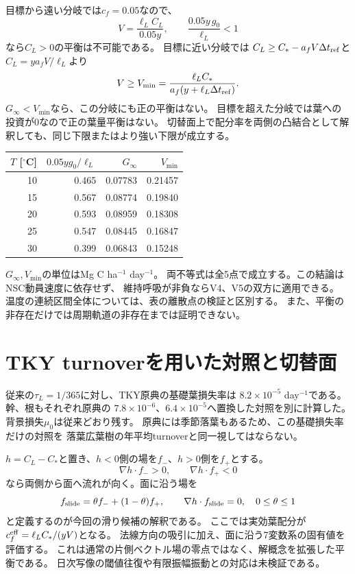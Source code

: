 \documentclass[a4paper,11pt]{ltjsarticle}
\begin{document}
目標から遠い分岐では$c_f=0.05$なので、
\[
V=\frac{\ell_LC_L}{0.05y},\qquad
\frac{0.05y\,g_0}{\ell_L}<1
\]
なら$C_L>0$の平衡は不可能である。
目標に近い分岐では
$C_L\ge C_*-a_fV\Delta t_{\rm ref}$と
$C_L=ya_fV/\ell_L$より
\begin{equation}
V\ge V_{\min}
=\frac{\ell_LC_*}{a_f(y+\ell_L\Delta t_{\rm ref})}.
\end{equation}
$G_\infty<V_{\min}$なら、この分岐にも正の平衡はない。
目標を超えた分岐では葉への投資が0なので正の葉量平衡はない。
切替面上で配分率を両側の凸結合として解釈しても、同じ下限またはより強い下限が成立する。

\begin{center}
\begin{tabular}{rrrr}
\toprule
$T$ [$^\circ$C]&$0.05y g_0/\ell_L$&$G_\infty$&$V_{\min}$\\\midrule
10&0.465&0.07783&0.21457\\
15&0.567&0.08774&0.19840\\
20&0.593&0.08959&0.18308\\
25&0.547&0.08445&0.16847\\
30&0.399&0.06843&0.15248\\\bottomrule
\end{tabular}
\end{center}
$G_\infty,V_{\min}$の単位はMg C ha$^{-1}$ day$^{-1}$。
両不等式は全5点で成立する。この結論はNSC動員速度に依存せず、
維持呼吸が非負ならV4、V5の双方に適用できる。
温度の連続区間全体については、表の離散点の検証と区別する。
また、平衡の非存在だけでは周期軌道の非存在までは証明できない。

\section{TKY turnoverを用いた対照と切替面}
従来の$\tau_L=1/365$に対し、TKY原典の基礎葉損失率は
$8.2\times10^{-5}$ day$^{-1}$である。幹、根もそれぞれ原典の
$7.8\times10^{-6}$、$6.4\times10^{-5}$へ置換した対照を別に計算した。
背景損失$\mu_0$は従来どおり残す。
原典には季節落葉もあるため、この基礎損失率だけの対照を
落葉広葉樹の年平均turnoverと同一視してはならない。

$h=C_L-C_*$と置き、$h<0$側の場を$f_-$、$h>0$側を$f_+$とする。
\[
\nabla h\cdot f_->0,\qquad \nabla h\cdot f_+<0
\]
なら両側から面へ流れが向く。面に沿う場を
\[
f_{\rm slide}=\theta f_-+(1-\theta)f_+,\qquad
\nabla h\cdot f_{\rm slide}=0,\quad 0\le\theta\le1
\]
と定義するのが今回の滑り候補の解釈である。
ここでは実効葉配分が
$c_f^{\rm eff}=\ell_LC_*/(yV)$となる。
法線方向の吸引に加え、面に沿う7変数系の固有値を評価する。
これは通常の片側ベクトル場の零点ではなく、解概念を拡張した平衡である。
日次写像の閾値往復や有限振幅振動との対応は未検証である。
\end{document}
